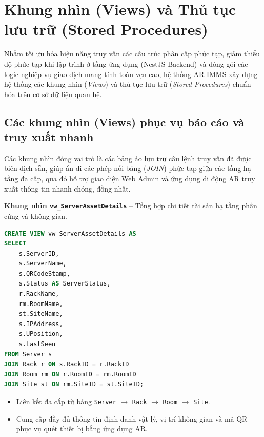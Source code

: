 \section{Khung nhìn (Views) và Thủ tục lưu trữ (Stored Procedures)}

Nhằm tối ưu hóa hiệu năng truy vấn các cấu trúc phân cấp phức tạp, giảm thiểu độ phức tạp khi lập trình ở tầng ứng dụng (NestJS Backend) và đóng gói các logic nghiệp vụ giao dịch mang tính toàn vẹn cao, hệ thống AR-IMMS xây dựng hệ thống các khung nhìn (\textit{Views}) và thủ tục lưu trữ (\textit{Stored Procedures}) chuẩn hóa trên cơ sở dữ liệu quan hệ.

\subsection{Các khung nhìn (Views) phục vụ báo cáo và truy xuất nhanh}

Các khung nhìn đóng vai trò là các bảng ảo lưu trữ câu lệnh truy vấn đã được biên dịch sẵn, giúp ẩn đi các phép nối bảng (\textit{JOIN}) phức tạp giữa các tầng hạ tầng đa cấp, qua đó hỗ trợ giao diện Web Admin và ứng dụng di động AR truy xuất thông tin nhanh chóng, đồng nhất.

\vspace{0.5em}
\noindent\textbf{Khung nhìn \texttt{vw\_ServerAssetDetails}} -- Tổng hợp chi tiết tài sản hạ tầng phần cứng và không gian.

\begin{tcolorbox}[colback=gray!5, colframe=gray!60, title={\textbf{CREATE VIEW vw\_ServerAssetDetails}}, fonttitle=\bfseries\small, boxrule=0.5pt, arc=2pt]
\begin{lstlisting}[language=SQL, basicstyle=\ttfamily\small, breaklines=true, showstringspaces=false, keywordstyle=\bfseries\color{blue!70!black}, stringstyle=\color{red!70!black}, commentstyle=\itshape\color{green!50!black}]
CREATE VIEW vw_ServerAssetDetails AS
SELECT 
    s.ServerID,
    s.ServerName,
    s.QRCodeStamp,
    s.Status AS ServerStatus,
    r.RackName,
    rm.RoomName,
    st.SiteName,
    s.IPAddress,
    s.UPosition,
    s.LastSeen
FROM Server s
JOIN Rack r ON s.RackID = r.RackID
JOIN Room rm ON r.RoomID = rm.RoomID
JOIN Site st ON rm.SiteID = st.SiteID;
\end{lstlisting}
\end{tcolorbox}

\begin{itemize}[leftmargin=2em]
    \item Liên kết đa cấp từ bảng \texttt{Server} $\rightarrow$ \texttt{Rack} $\rightarrow$ \texttt{Room} $\rightarrow$ \texttt{Site}.
    \item Cung cấp đầy đủ thông tin định danh vật lý, vị trí không gian và mã QR phục vụ quét thiết bị bằng ứng dụng AR.
\end{itemize}

